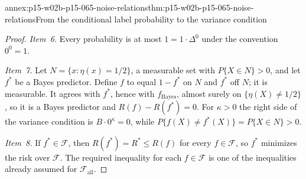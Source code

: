 \begin{annexitem}{annex:p15-w02b-p15-065-noise-relations}{thm:p15-w02b-p15-065-noise-relations}{From the conditional label probability to the variance condition}
\begin{proof}
\emph{Item~6.} Every probability is at most \(1=1\cdot\Delta^{0}\) under
the convention \(0^0=1\).

\emph{Item~7.} Let \(N=\{x:\eta(x)=1/2\}\), a measurable set with
\(P\{X\in N\}>0\), and let \(f^{*}\) be a Bayes predictor. Define \(f\) to
equal \(1-f^{*}\) on \(N\) and \(f^{*}\) off \(N\); it is measurable. It
agrees with \(f^{*}\), hence with \(f_{\mathrm{Bayes}}\), almost surely on
\(\{\eta(X)\ne1/2\}\), so it is a Bayes predictor and
\(R(f)-R(f^{*})=0\). For \(\kappa>0\) the right side of the variance
condition is \(B\cdot0^{\kappa}=0\), while
\(P\{f(X)\ne f^{*}(X)\}=P\{X\in N\}>0\).

\emph{Item~8.} If \(f^{*}\in\mathcal F\), then \(R(f^{*})=R^{*}\leq R(f)\)
for every \(f\in\mathcal F\), so \(f^{*}\) minimizes the risk over
\(\mathcal F\). The required inequality for each \(f\in\mathcal F\) is one
of the inequalities already assumed for \(\mathcal F_{\mathrm{all}}\).
\end{proof}
\end{annexitem}

